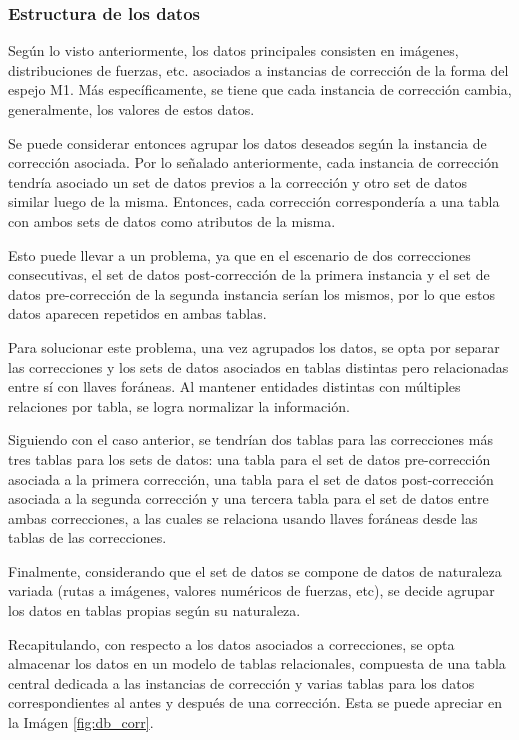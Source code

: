 \subsubsection{Estructura de los datos}

Según lo visto anteriormente, los datos principales consisten en imágenes, distribuciones de fuerzas, etc. asociados a instancias de corrección de la forma del espejo M1. Más específicamente, se tiene que cada instancia de corrección cambia, generalmente, los valores de estos datos. 

Se puede considerar entonces agrupar los datos deseados según la instancia de corrección asociada. Por lo señalado anteriormente, cada instancia de corrección tendría asociado un set de datos previos a la corrección y otro set de datos similar luego de la misma. Entonces, cada corrección correspondería a una tabla con ambos sets de datos como atributos de la misma.

Esto puede llevar a un problema, ya que en el escenario de dos correcciones consecutivas, el set de datos post-corrección de la primera instancia y el set de datos pre-corrección de la segunda instancia serían los mismos, por lo que estos datos aparecen repetidos en ambas tablas.

Para solucionar este problema, una vez agrupados los datos, se opta por separar las correcciones y los sets de datos asociados en tablas distintas pero relacionadas entre sí con llaves foráneas. Al mantener entidades distintas con múltiples relaciones por tabla, se logra normalizar la información.

Siguiendo con el caso anterior, se tendrían dos tablas para las correcciones más tres tablas para los sets de datos: una tabla para el set de datos pre-corrección asociada a la primera corrección, una tabla para el set de datos post-corrección asociada a la segunda corrección y una tercera tabla para el set de datos entre ambas correcciones, a las cuales se relaciona usando llaves foráneas desde las tablas de las correcciones.

Finalmente, considerando que el set de datos se compone de datos de naturaleza variada (rutas a imágenes, valores numéricos de fuerzas, etc), se decide agrupar los datos en tablas propias según su naturaleza.

Recapitulando, con respecto a los datos asociados a correcciones, se opta almacenar los datos en un modelo de tablas relacionales, compuesta de una tabla central dedicada a las instancias de corrección y varias tablas para los datos correspondientes al antes y después de una corrección. Esta se puede apreciar en la Imágen \ref{fig:db_corr}.

